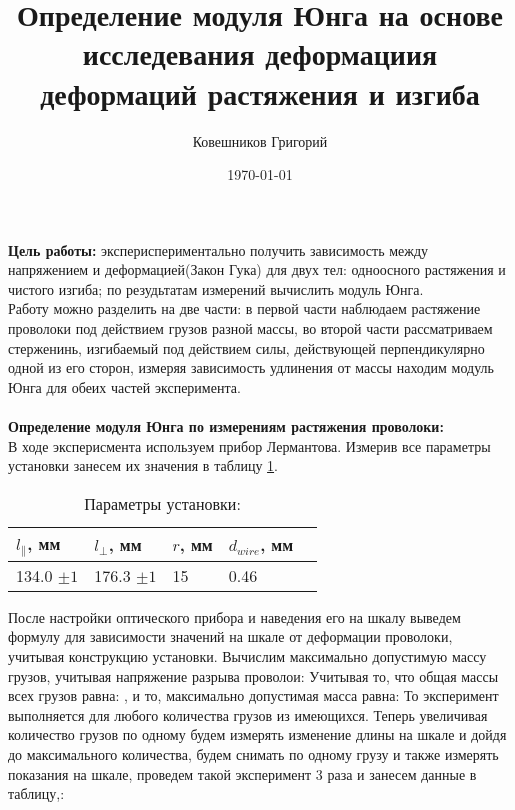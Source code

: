\documentclass[a4paper,12pt]{article}
\author{Ковешников Григорий}
\title{Определение модуля Юнга на основе исследевания деформациия деформаций растяжения и изгиба}
\date{\today}
\begin{document}
	\maketitle
	\textbf{Цель работы:} экспериспериментально получить зависимость между напряжением и деформацией(Закон Гука) для двух тел: одноосного растяжения и чистого изгиба; по резудьтатам измерений вычислить модуль Юнга.\\
	
	Работу можно разделить на две части: в первой части наблюдаем растяжение проволоки под действием грузов разной массы, во второй части рассматриваем стерженинь, изгибаемый под действием силы, действующей перпендикулярно одной из его сторон, измеряя зависимость удлинения от массы находим модуль Юнга для обеих частей эксперимента. \\ \\
	\large{\textbf{Определение модуля Юнга по измерениям растяжения проволоки:}}\\
	В ходе эксперисмента используем прибор Лермантова. %
	Измерив все параметры установки занесем их значения в таблицу \ref{tabl:1}.
	
	\begin{table}
		\caption{Параметры установки:}
		\label{tabl:1}
		\begin{center}
			\begin{tabular}{|l|l|l|l|l|}\hline
				\(l_{\parallel}\), мм & \(l_{\perp}\), мм & \(r\), мм & \(d_{wire}\), мм \\ \hline
				134.0 \(\pm 1\) & 176.3 \(\pm 1\) & 15 & 0.46 \\ \hline	
				
			\end{tabular}
		\end{center}
	\end{table}
	
	После настройки оптического прибора и наведения его на шкалу выведем формулу для зависимости значений на шкале от деформации проволоки, учитывая конструкцию установки.%
	Вычислим максимально допустимую массу грузов, учитывая напряжение разрыва проволои:%
	Учитывая то, что общая массы всех грузов равна:%
	, и то, максимально допустимая масса равна:%
	То эксперимент выполняется для любого количества грузов из имеющихся. Теперь увеличивая количество грузов по одному будем измерять изменение длины на шкале и дойдя до максимального количества, будем снимать по одному грузу и также измерять показания на шкале, проведем такой эксперимент 3 раза и занесем данные в таблицу,:
	
\end{document}
